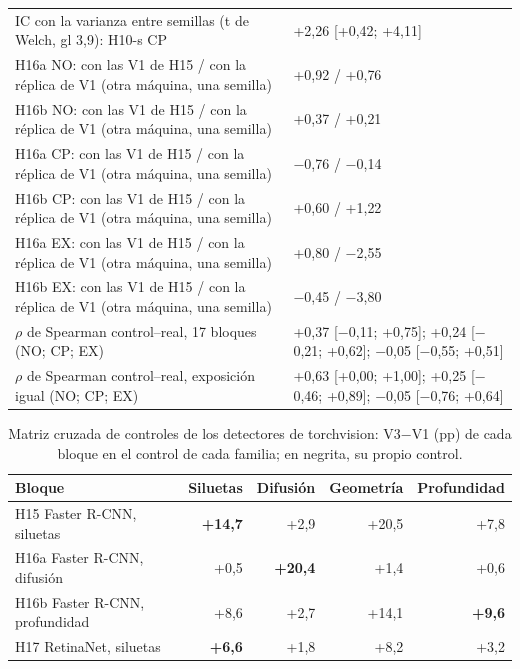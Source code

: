 \begin{table}[H]
\begin{tabular}{@{}p{8.6cm} p{6.6cm}@{}}
IC con la varianza entre semillas (t de Welch, gl 3{,}9): H10-s CP & +2{,}26 [+0{,}42; +4{,}11] \\
H16a NO: con las V1 de H15 / con la réplica de V1 (otra máquina, una semilla) & +0{,}92 / +0{,}76 \\
H16b NO: con las V1 de H15 / con la réplica de V1 (otra máquina, una semilla) & +0{,}37 / +0{,}21 \\
H16a CP: con las V1 de H15 / con la réplica de V1 (otra máquina, una semilla) & $-$0{,}76 / $-$0{,}14 \\
H16b CP: con las V1 de H15 / con la réplica de V1 (otra máquina, una semilla) & +0{,}60 / +1{,}22 \\
H16a EX: con las V1 de H15 / con la réplica de V1 (otra máquina, una semilla) & +0{,}80 / $-$2{,}55 \\
H16b EX: con las V1 de H15 / con la réplica de V1 (otra máquina, una semilla) & $-$0{,}45 / $-$3{,}80 \\
$\rho$ de Spearman control--real, 17 bloques (NO; CP; EX) & +0{,}37 [$-$0{,}11; +0{,}75]; +0{,}24 [$-$0{,}21; +0{,}62]; $-$0{,}05 [$-$0{,}55; +0{,}51] \\
$\rho$ de Spearman control--real, exposición igual (NO; CP; EX) & +0{,}63 [+0{,}00; +1{,}00]; +0{,}25 [$-$0{,}46; +0{,}89]; $-$0{,}05 [$-$0{,}76; +0{,}64] \\
\bottomrule\end{tabular}\end{table}

\begin{table}[H]\centering\scriptsize
\caption{Matriz cruzada de controles de los detectores de torchvision: V3$-$V1 (pp) de cada bloque en el control de cada familia; en negrita, su propio control.}\label{tab:s-cruzada-tv}
\begin{tabular}{@{}l rrrr@{}}\toprule
Bloque & Siluetas & Difusión & Geometría & Profundidad \\ \midrule
H15 Faster R-CNN, siluetas & \textbf{+14{,}7} & +2{,}9 & +20{,}5 & +7{,}8 \\
H16a Faster R-CNN, difusión & +0{,}5 & \textbf{+20{,}4} & +1{,}4 & +0{,}6 \\
H16b Faster R-CNN, profundidad & +8{,}6 & +2{,}7 & +14{,}1 & \textbf{+9{,}6} \\
H17 RetinaNet, siluetas & \textbf{+6{,}6} & +1{,}8 & +8{,}2 & +3{,}2 \\
\bottomrule\end{tabular}\end{table}

